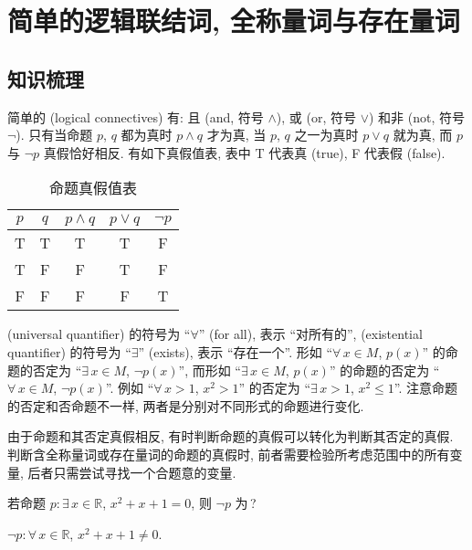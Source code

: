   \section{简单的逻辑联结词, 全称量词与存在量词}

  \subsection{知识梳理}
  简单的 (logical connectives) 有: 且 (and, 符号 $\wedge$), 或 (or, 符号 $\vee$) 和非 (not, 符号 $\neg$). 
  只有当命题 $p$, $q$ 都为真时 $p\wedge q$ 才为真, 当 $p$, $q$ 之一为真时 
  $p\vee q$ 就为真, 而 $p$ 与 $\neg p$ 真假恰好相反. 
  有如下真假值表, 表中 T 代表真 (true), F 代表假 (false).
  \begin{table}[htb]
    \small
    \centering
    \caption{命题真假值表}
    \begin{tabular}{ccccc}
      \toprule
      $p$ & $q$ & $p\wedge q$ & $p\vee q$ & $\neg p$\\
      \midrule
      T & T & T & T & F \\
      T & F & F & T & F \\
      F & F & F & F & T \\
      \bottomrule
    \end{tabular}
  \end{table}

   (universal quantifier) 的符号为 ``$\forall$'' (for all), 表示 ``对所有的'', 
   (existential quantifier) 的符号为 ``$\exists$'' (exists), 表示 ``存在一个''.
  形如 ``$\forall\, x\in M$, $p(x)$'' 的命题的否定为 
  ``$\exists\, x\in M$, $\neg p(x)$'', 
  而形如 ``$\exists\, x\in M$, $p(x)$'' 的命题的否定为 
  ``$\forall\, x\in M$, $\neg p(x)$''. 例如 ``$\forall\, x>1$, $x^2>1$'' 
  的否定为 ``$\exists\, x>1$, $x^2\leqslant 1$''. 注意命题的否定和否命题不一样, 
  两者是分别对不同形式的命题进行变化.
  
  由于命题和其否定真假相反, 有时判断命题的真假可以转化为判断其否定的真假. 判断含全称量词或存在量词的命题的真假时, 前者需要检验所考虑范围中的所有变量, 后者只需尝试寻找一个合题意的变量.

  \lianxi
  \begin{exercise}
    若命题 $p\colon \exists\, x\in \mathbb{R}$, $x^2 +x+1=0$, 
    则 $\neg p$ 为\,?
  \end{exercise}

  \beginsolution
    $\neg p\colon \forall\, x\in \mathbb{R}$, $x^2 +x+1\neq 0$.
  \endsolution
  
